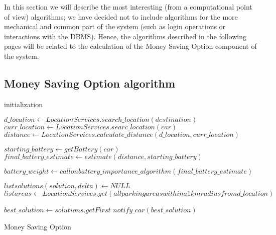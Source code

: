 In this section we will describe the most interesting (from a computational point of view) algorithms; we have decided not to include algorithms for the more mechanical and common part of the system (such as login operations or interactions with the DBMS). Hence, the algorithms described in the following pages will be related to the calculation of the Money Saving Option component of the system.

\subsection{Money Saving Option algorithm}

\begin{algorithm}[H]
	initialization\;
	
	$d\_location \leftarrow LocationServices.search\_location(destination)$\;
	$curr\_location \leftarrow LocationServices.searc\_location(car)$\;
	$distance \leftarrow LocationServices.calculate\_distance (d\_location, curr\_location)$\;
	
	$starting\_battery \leftarrow getBattery(car)$\;
	$final\_battery\_estimate \leftarrow estimate(distance, starting\_battery)$\;
	
	$battery\_weight \leftarrow call on battery\_importance\_algorithm(final\_battery\_estimate)$\;
	
	$list solutions(solution, delta) \leftarrow NULL$\;
	$list areas \leftarrow LocationServices.get(all parking areas within a 1km radius from d\_location)$\;
	
	
	$best\_solution \leftarrow solutions.getFirst$\;
	$notify\_car(best\_solution)$\;
	
	\caption{Money Saving Option}
\end{algorithm}

